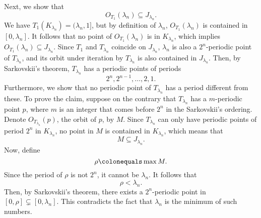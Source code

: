 \documentclass[10pt,twoside,draft]{book}
\begin{document}
\begin{example}
  Next, we show that 
  \begin{equation*}
    O_{T_1}(\lambda_n) \subseteq J_{\lambda_n}.
  \end{equation*}
We have $T_1(K_{\lambda_n}) = (\lambda_n, 1]$, but by definition of $\lambda_n$, $O_{T_1}(\lambda_n)$ is contained in $[0,\lambda_n]$.
It follows that no point of $O_{T_1}(\lambda_n)$ is in $K_{\lambda_n}$, which implies $O_{T_1}(\lambda_n) \subseteq J_{\lambda_n}$.
Since $T_1$ and $T_{\lambda_n}$ coincide on $J_{\lambda_n}$, $\lambda_n$ is also a $2^n$-periodic point of $T_{\lambda_n}$, and its orbit under iteration by $T_{\lambda_n}$ is also contained in $J_{\lambda_n}$.
Then, by Sarkovskii's theorem, $T_{\lambda_n}$ has a periodic points of periods
\begin{equation*}
  2^n, 2^{n-1}, \ldots, 2, 1.
\end{equation*}
Furthermore, we show that no periodic point of $T_{\lambda_n}$ has a period different from these.
To prove the claim, suppose on the contrary that $T_{\lambda_n}$ has a $m$-periodic point $p$, where $m$ is an integer that comes before $2^n$ in the Sarkovskii's ordering.
Denote $O_{T_{\lambda_n}}(p)$, the orbit of $p$, by $M$.
Since $T_{\lambda_n}$ can only have periodic points of period $2^n$ in $K_{\lambda_n}$, no point in $M$ is contained in $K_{\lambda_n}$, which means that
\begin{equation*}
  M \subseteq J_{\lambda_n}.
\end{equation*}
Now, define 
\begin{equation*}
  \rho \ceq \max M.
\end{equation*}
Since the period of $\rho$ is not $2^n$, it cannot be $\lambda_n$.
It follows that
\begin{equation*}
  \rho < \lambda_n.
\end{equation*}
Then, by Sarkovskii's theorem, there exists a $2^n$-periodic point in $[0,\rho] \subsetneq [0, \lambda_n]$.
This contradicts the fact that $\lambda_n$ is the minimum of such numbers.


\end{example}
\end{document}
